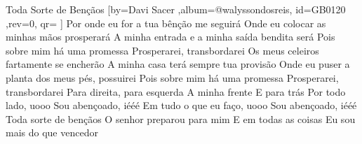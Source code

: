 \beginsong
{Toda Sorte de Bençãos %
}[by={Davi Sacer %
},album={@walyssondosreis},
id={GB0120 %
},rev={0}, %
qr={ %
}]
\beginverse*
Por onde eu for a tua bênção me seguirá
Onde eu colocar as minhas mãos prosperará
A minha entrada e a minha saída bendita será
Pois sobre mim há uma promessa
Prosperarei, transbordarei
\endverse
\beginverse*
Os meus celeiros fartamente se encherão
A minha casa terá sempre tua provisão
Onde eu puser a planta dos meus pés, possuirei
Pois sobre mim há uma promessa
Prosperarei, transbordarei
\endverse
\beginchorus
Para direita, para esquerda
A minha frente
E para trás
Por todo lado, uooo
Sou abençoado, iééé
Em tudo o que eu faço, uooo
Sou abençoado, iééé
\endchorus
\beginverse*
Toda sorte de bençãos
O senhor preparou para mim
E em todas as coisas
Eu sou mais do que vencedor
\endverse

